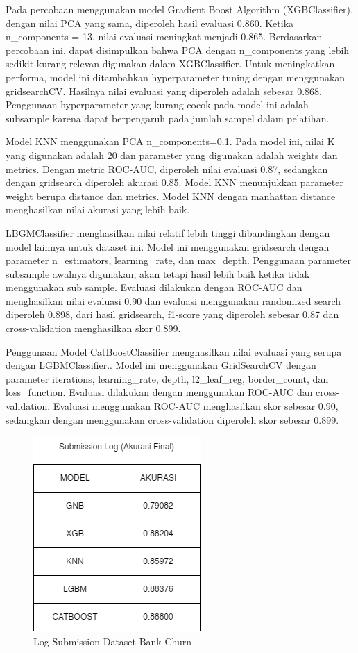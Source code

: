 \documentclass[conference]{IEEEtran}
\begin{document}
Pada percobaan menggunakan model Gradient Boost Algorithm (XGBClassifier), dengan nilai PCA yang sama, diperoleh hasil  evaluasi 0.860. Ketika n\_components = 13, nilai evaluasi meningkat menjadi 0.865. 
Berdasarkan percobaan ini, dapat disimpulkan bahwa PCA dengan n\_components yang lebih sedikit kurang relevan digunakan dalam XGBClassifier. Untuk meningkatkan performa, model ini ditambahkan 
hyperparameter tuning dengan menggunakan gridsearchCV. Hasilnya nilai evaluasi yang diperoleh adalah sebesar 0.868. Penggunaan hyperparameter yang kurang cocok pada model ini adalah subsample karena dapat berpengaruh pada jumlah sampel dalam pelatihan.

Model KNN menggunakan PCA n\_components=0.1. Pada model ini, nilai K yang digunakan adalah 20 dan parameter yang digunakan adalah weights dan metrics. 
Dengan metric ROC-AUC, diperoleh nilai evaluasi 0.87, sedangkan dengan gridsearch diperoleh akurasi 0.85. Model KNN menunjukkan parameter weight berupa distance dan metrics. Model KNN dengan manhattan distance 
menghasilkan nilai akurasi yang lebih baik.

LBGMClassifier menghasilkan nilai relatif lebih tinggi dibandingkan dengan model lainnya untuk dataset ini. Model ini menggunakan gridsearch dengan parameter 
n\_estimators, learning\_rate, dan max\_depth. Penggunaan parameter subsample awalnya digunakan, akan tetapi hasil lebih baik ketika tidak menggunakan sub sample. 
Evaluasi dilakukan dengan ROC-AUC dan menghasilkan nilai evaluasi 0.90 dan evaluasi menggunakan randomized search diperoleh 0.898, dari hasil gridsearch, f1-score yang 
diperoleh sebesar 0.87 dan cross-validation menghasilkan skor 0.899.

Penggunaan Model CatBoostClassifier menghasilkan nilai evaluasi yang serupa dengan LGBMClassifier.. Model ini menggunakan GridSearchCV dengan parameter iterations, 
learning\_rate, depth, l2\_leaf\_reg, border\_count, dan loss\_function. Evaluasi dilakukan dengan menggunakan ROC-AUC dan cross-validation. Evaluasi menggunakan ROC-AUC 
menghasilkan skor sebesar 0.90, sedangkan dengan menggunakan cross-validation diperoleh skor sebesar 0.899.

\begin{figure}[htbp]
    \centerline{\includegraphics[scale=0.5]{churn_log.png}}
    \caption{Log Submission Dataset Bank Churn}
    \label{churn_log}
\end{figure}
\end{document}
